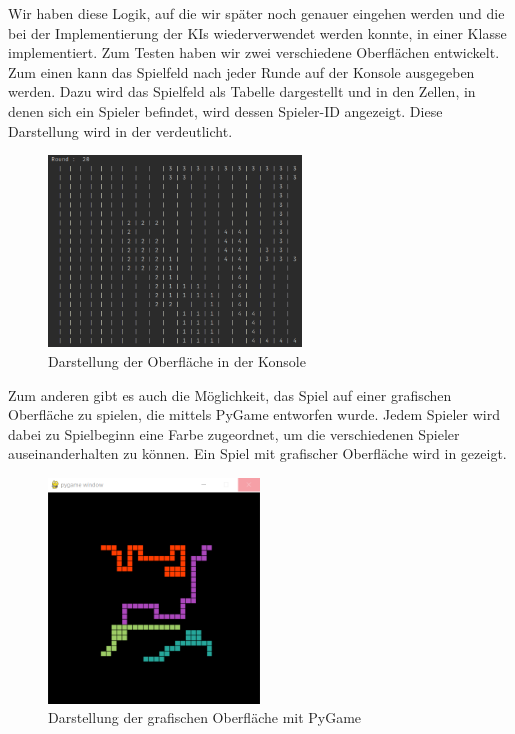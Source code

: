 Wir haben diese Logik, auf die wir später noch genauer eingehen werden und die bei der Implementierung der \ac{KI}s
wiederverwendet werden konnte, in einer Klasse  implementiert.
Zum Testen haben wir zwei verschiedene Oberflächen entwickelt.
Zum einen kann das Spielfeld nach jeder Runde auf der Konsole ausgegeben werden.
Dazu wird das Spielfeld als Tabelle dargestellt und in den Zellen, in denen sich ein Spieler befindet, wird dessen
Spieler-ID angezeigt.
Diese Darstellung wird in der  verdeutlicht.

\begin{figure}[htb]
\centering
\includegraphics[width=0.6\textwidth]{Bilder/KonsolenOberflaeche.png}
\caption{Darstellung der Oberfläche in der Konsole}
\label{fig:KonsolenOberflaeche}
\end{figure}

Zum anderen gibt es auch die Möglichkeit, das Spiel auf einer grafischen Oberfläche zu spielen, die mittels PyGame
entworfen wurde.
Jedem Spieler wird dabei zu Spielbeginn eine Farbe zugeordnet, um die verschiedenen Spieler auseinanderhalten zu können.
Ein Spiel mit grafischer Oberfläche wird in  gezeigt.

\begin{figure}[htb]
\centering
\includegraphics[width=0.5\textwidth]{Bilder/GrafischeOberflaeche.png}
\caption{Darstellung der grafischen Oberfläche mit PyGame}
\label{fig:GrafischeOberflaeche}
\end{figure}